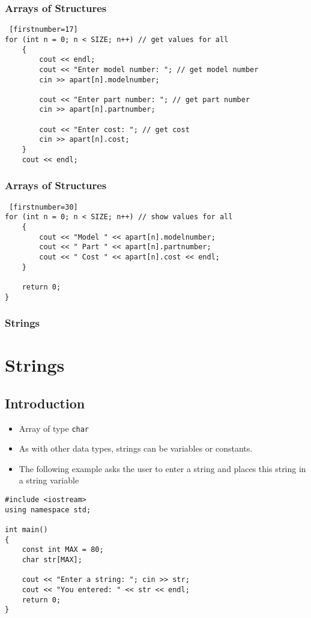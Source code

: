 \documentclass{beamer}
\begin{document}
\begin{frame}[fragile]\frametitle{Arrays of Structures}
    \lstset{style=mystyle}
\begin{lstlisting} [firstnumber=17]
for (int n = 0; n < SIZE; n++) // get values for all
    {
        cout << endl;
        cout << "Enter model number: "; // get model number
        cin >> apart[n].modelnumber;

        cout << "Enter part number: "; // get part number
        cin >> apart[n].partnumber;

        cout << "Enter cost: "; // get cost
        cin >> apart[n].cost;
    }
    cout << endl;
\end{lstlisting}
\end{frame}

\begin{frame}[fragile]\frametitle{Arrays of Structures}
    \lstset{style=mystyle}
    \begin{lstlisting} [firstnumber=30]
for (int n = 0; n < SIZE; n++) // show values for all
    {
        cout << "Model " << apart[n].modelnumber;
        cout << " Part " << apart[n].partnumber;
        cout << " Cost " << apart[n].cost << endl;
    }

    return 0;
}
\end{lstlisting}
\end{frame}

\begin{frame}[fragile]\frametitle{Strings}
    \section{Strings} %
    \label{sec:strings}
    \subsection{Introduction} %
    \label{sub:introduction}
    \begin{itemize}
        \item Array of type \texttt{char}
        \item As with other data types, strings can be variables or constants.
        \item The following example asks the user to enter a string and places this string in a string variable
    \end{itemize}
    \lstset{style=mystyle}
    \begin{lstlisting}
#include <iostream>
using namespace std;

int main()
{
    const int MAX = 80;
    char str[MAX];

    cout << "Enter a string: "; cin >> str;
    cout << "You entered: " << str << endl;
    return 0;
}
\end{lstlisting}
\end{frame}
\end{document}
